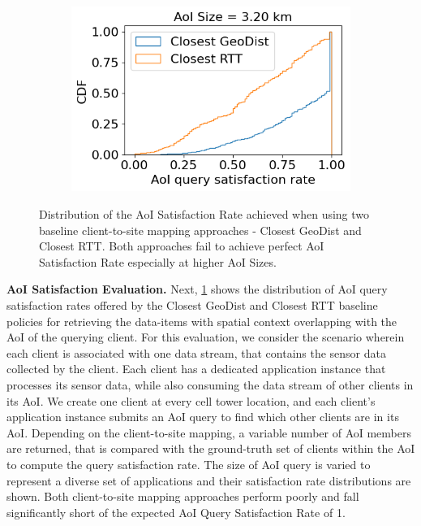 \begin{figure}
\begin{subfigure}{0.333\textwidth}
  \includegraphics[width=\linewidth]{figures/mechanisms/spatial_ctx_mgmt/aoi_satisfaction_rate_cdf_AOI_3_200_km.png}
  \caption{}
\end{subfigure}
\caption{Distribution of the AoI Satisfaction Rate achieved when using two baseline client-to-site mapping approaches - Closest GeoDist and Closest RTT. Both approaches fail to achieve perfect AoI Satisfaction Rate especially at higher AoI Sizes.}
\label{fig:aoi_satisfaction_rate_eval}
\end{figure}

\par \noindent \textbf{AoI Satisfaction Evaluation.} Next, \cref{fig:aoi_satisfaction_rate_eval} shows the distribution of AoI query satisfaction rates offered by the Closest GeoDist and Closest RTT baseline policies for retrieving the data-items with spatial context overlapping with the AoI of the querying client. For this evaluation, we consider the scenario wherein each client is associated with one data stream, that contains the sensor data collected by the client. Each client has a dedicated application instance that processes its sensor data, while also consuming the data stream of other clients in its AoI. We create one client at every cell tower location, and each client's application instance submits an AoI query to find which other clients are in its AoI. Depending on the client-to-site mapping, a variable number of AoI members are returned, that is compared with the ground-truth set of clients within the AoI to compute the query satisfaction rate. The size of AoI query is varied to represent a diverse set of applications and their satisfaction rate distributions are shown. Both client-to-site mapping approaches perform poorly and fall significantly short of the expected AoI Query Satisfaction Rate of 1.

